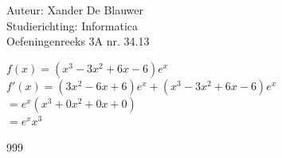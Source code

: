 \documentclass[a4paper]{article}
\begin{document}
\noindent \large Auteur: Xander De Blauwer \\
\noindent \large Studierichting: Informatica\\
\noindent \large Oefeningenreeks 3A nr. 34.13 \\

\medskip

\normalsize

$f(x) = (x^3 - 3x^2 + 6x - 6)e^x$ \\

$f'(x) = (3x^2 - 6x + 6)e^x + (x^3 -3x^2 + 6x - 6)e^x$ \\

$ = e^x(x^3 + 0x^2 + 0x + 0)$ \\

$ = e^x x^3 $ \\





\begin{thebibliography}{999}
\end{thebibliography}
\end{document}
